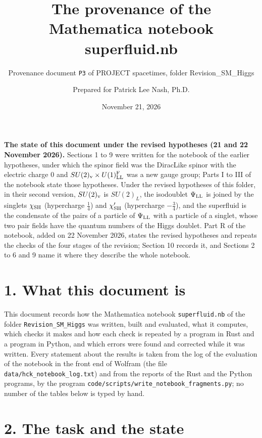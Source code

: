 \documentclass[
  10pt,
]{article}
\title{The provenance of the Mathematica notebook superfluid.nb}
\subtitle{Provenance document \texttt{P3} of PROJECT spacetimes, folder
Revision\_SM\_Higgs}
\author{Prepared for Patrick Lee Nash, Ph.D.}
\date{November 21, 2026}
\begin{document}
\maketitle

\textbf{The state of this document under the revised hypotheses (21 and
22 November 2026).} Sections 1 to 9 were written for the notebook of the
earlier hypotheses, under which the spinor field was the DiracLike
spinor with the electric charge 0 and
\(SU(2)_{\rm v}\times U(1)^{\rm F}_{\rm LL}\) was a new gauge group;
Parts I to III of the notebook state those hypotheses. Under the revised
hypotheses of this folder, in their second version, \(SU(2)_{\rm v}\) is
\(SU(2)_L\), the isodoublet \(\Psi_{\rm LL}\) is joined by the singlets
\(\chi_{\rm SH}\) (hypercharge \(\tfrac14\)) and \(\chi'_{\rm SH}\)
(hypercharge \(-\tfrac34\)), and the superfluid is the condensate of the
pairs of a particle of \(\Psi_{\rm LL}\) with a particle of a singlet,
whose two pair fields have the quantum numbers of the Higgs doublet.
Part R of the notebook, added on 22 November 2026, states the revised
hypotheses and repeats the checks of the four stages of the revision;
Section 10 records it, and Sections 2 to 6 and 9 name it where they
describe the whole notebook.

\hypertarget{what-this-document-is}{%
\section{1. What this document is}\label{what-this-document-is}}

This document records how the Mathematica notebook
\texttt{superfluid.nb} of the folder \texttt{Revision\_SM\_Higgs} was
written, built and evaluated, what it computes, which checks it makes
and how each check is repeated by a program in Rust and a program in
Python, and which errors were found and corrected while it was written.
Every statement about the results is taken from the log of the
evaluation of the notebook in the front end of Wolfram (the file
\texttt{data/hck\_notebook\_log.txt}) and from the reports of the Rust
and the Python programs, by the program
\texttt{code/scripts/write\_notebook\_fragments.py}; no number of the
tables below is typed by hand.

\hypertarget{the-task-and-the-state}{%
\section{2. The task and the state}\label{the-task-and-the-state}}
\end{document}
